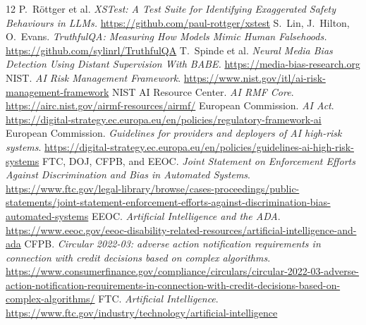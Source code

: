 \documentclass[11pt]{article}
\begin{document}
\begin{thebibliography}{12}
\small
{} P.\ R\"ottger et al. \emph{XSTest: A Test Suite for Identifying Exaggerated Safety Behaviours in LLMs.} \url{https://github.com/paul-rottger/xstest}
 S.\ Lin, J.\ Hilton, O.\ Evans. \emph{TruthfulQA: Measuring How Models Mimic Human Falsehoods.} \url{https://github.com/sylinrl/TruthfulQA}
 T.\ Spinde et al. \emph{Neural Media Bias Detection Using Distant Supervision With BABE.} \url{https://media-bias-research.org}
 NIST. \emph{AI Risk Management Framework}. \url{https://www.nist.gov/itl/ai-risk-management-framework}
 NIST AI Resource Center. \emph{AI RMF Core}. \url{https://airc.nist.gov/airmf-resources/airmf/}
 European Commission. \emph{AI Act}. \url{https://digital-strategy.ec.europa.eu/en/policies/regulatory-framework-ai}
 European Commission. \emph{Guidelines for providers and deployers of AI high-risk systems}. \url{https://digital-strategy.ec.europa.eu/en/policies/guidelines-ai-high-risk-systems}
 FTC, DOJ, CFPB, and EEOC. \emph{Joint Statement on Enforcement Efforts Against Discrimination and Bias in Automated Systems}. \url{https://www.ftc.gov/legal-library/browse/cases-proceedings/public-statements/joint-statement-enforcement-efforts-against-discrimination-bias-automated-systems}
 EEOC. \emph{Artificial Intelligence and the ADA}. \url{https://www.eeoc.gov/eeoc-disability-related-resources/artificial-intelligence-and-ada}
 CFPB. \emph{Circular 2022-03: adverse action notification requirements in connection with credit decisions based on complex algorithms}. \url{https://www.consumerfinance.gov/compliance/circulars/circular-2022-03-adverse-action-notification-requirements-in-connection-with-credit-decisions-based-on-complex-algorithms/}
 FTC. \emph{Artificial Intelligence}. \url{https://www.ftc.gov/industry/technology/artificial-intelligence}
\end{thebibliography}
\end{document}
